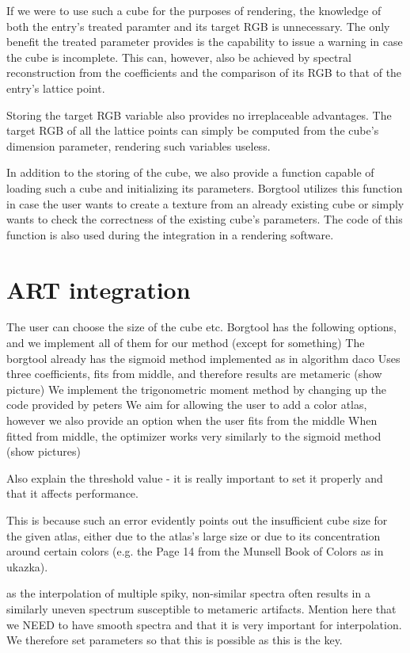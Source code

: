 If we were to use such a cube for the purposes of rendering, the knowledge of both the entry's treated paramter and its target RGB is unnecessary. The only benefit the treated parameter provides is the capability to issue a warning in case the cube is incomplete. This can, however, also be achieved by spectral reconstruction from the coefficients and the comparison of its RGB to that of the entry's lattice point.

Storing the target RGB variable also provides no irreplaceable advantages. The target RGB of all the lattice points can simply be computed from the cube's dimension parameter, rendering such variables useless.

In addition to the storing of the cube, we also provide a function capable of loading such a cube and initializing its parameters. Borgtool utilizes this function in case the user wants to create a texture from an already existing cube or simply wants to check the correctness of the existing cube's parameters. The code of this function is also used during the integration in a rendering software.

\section{ART integration}

The user can choose the size of the cube etc. Borgtool has the following options, and we implement all of them for our method (except for something)
The borgtool already has the sigmoid method implemented as in algorithm daco
Uses three coefficients, fits from middle, and therefore results are metameric (show picture)
We implement the trigonometric moment method by changing up the code provided by peters
We aim for allowing the user to add a color atlas, however we also provide an option when the user fits from the middle
When fitted from middle, the optimizer works very similarly to the sigmoid method (show pictures)

Also explain the threshold value - it is really important to set it properly and that it affects performance.

This is because such an error evidently points out the insufficient cube size for the given atlas, either due to the atlas's large size or due to its concentration around certain colors (e.g. the Page 14 from the Munsell Book of Colors as in ukazka).

 as the interpolation of multiple spiky, non-similar spectra often results in a similarly uneven spectrum susceptible to metameric artifacts. Mention here that we NEED to have smooth spectra and that it is very important for interpolation. We therefore set parameters so that this is possible as this is the key. 
